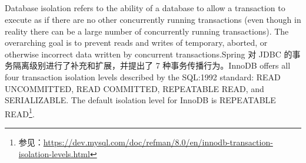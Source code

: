 \documentclass[../../../interview-questions.tex]{subfiles}
\begin{document}
\subsection{\color{red}{数据库事务的隔离级别(Database Transaction Isolation Levels)}}

Database isolation refers to the ability of a database to allow a transaction to execute as if there are no other concurrently running transactions (even though in reality there can be a large number of concurrently running transactions). The overarching goal is to prevent reads and writes of temporary, aborted, or otherwise incorrect data written by concurrent transactions.Spring 对 JDBC 的事务隔离级别进行了补充和扩展，并提出了 7 种事务传播行为。InnoDB offers all four transaction isolation levels described by the SQL:1992 standard: READ UNCOMMITTED, READ COMMITTED, REPEATABLE READ, and SERIALIZABLE. The default isolation level for InnoDB is REPEATABLE READ\footnote{参见：\url{https://dev.mysql.com/doc/refman/8.0/en/innodb-transaction-isolation-levels.html}}.
\end{document}
